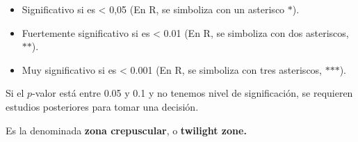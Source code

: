 \documentclass[
]{article}
\providecommand{\tightlist}{%
  \setlength{\itemsep}{0pt}\setlength{\parskip}{0pt}}
\begin{document}
\begin{itemize}
\tightlist
\item
  Significativo si es \textless{} 0,05 (En R, se simboliza con un
  asterisco \(\text{*}\)).
\item
  Fuertemente significativo si es \textless{} 0.01 (En R, se simboliza
  con dos asteriscos, \(\text{**}\)).
\item
  Muy significativo si es \textless{} 0.001 (En R, se simboliza con tres
  asteriscos, \(\text{***}\)).
\end{itemize}

Si el \(p\)-valor está entre 0.05 y 0.1 y no tenemos nivel de
significación, se requieren estudios posteriores para tomar una
decisión.

Es la denominada \textbf{zona crepuscular}, o \textbf{twilight zone.}
\end{document}
